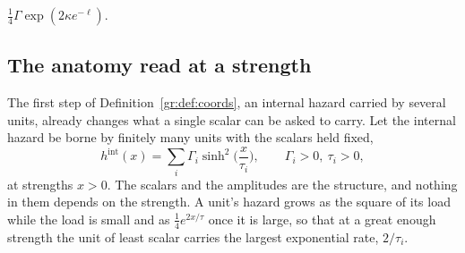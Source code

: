 $\tfrac14\Gamma\exp(2\kappa e^{-\ell})$.

\subsection{The anatomy read at a strength}\label{gr:sub:reading}

The first step of Definition~\ref{gr:def:coords}, an internal hazard
carried by several units, already changes what a single scalar can be
asked to carry. Let the internal hazard be borne by finitely many units
with the scalars held fixed,
\begin{equation}\label{gr:eq:modes}
h^{\mathrm{int}}(x)=\sum_i\Gamma_i\sinh^2\!\Big(\frac{x}{\tau_i}\Big),\qquad\Gamma_i>0,\ \tau_i>0,
\end{equation}
at strengths $x>0$. The scalars and the amplitudes are the structure, and
nothing in them depends on the strength. A unit's hazard grows as the
square of its load while the load is small and as $\tfrac14e^{2x/\tau}$
once it is large, so that at a great enough strength the unit of least
scalar carries the largest exponential rate, $2/\tau_i$.

